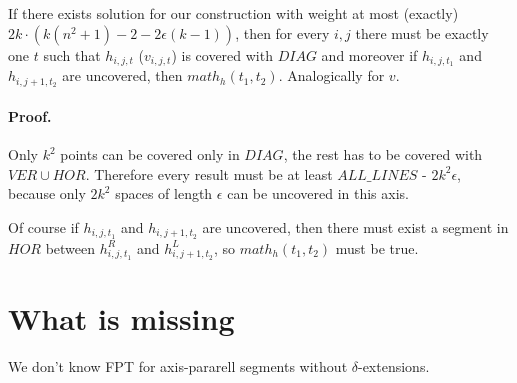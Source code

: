 \begin{lemma}
	\label{main_soundness_construction}
	If there exists solution for our construction
	with weight at most (exactly)
	$2k \cdot (k(n^2+1) - 2 - 2\epsilon(k-1))$,
	then for every $i, j$
	there must be exactly one $t$ such that $h_{i, j, t}$
	($v_{i, j, t}$) 
	is covered with $DIAG$
	and moreover if $h_{i, j, t_1}$ and $h_{i, j+1, t_2}$
	are uncovered, then $math_h(t_1, t_2)$.
	Analogically for $v$.
\end{lemma}
\paragraph{Proof.}
Only $k^2$ points can be covered only in $DIAG$, the rest
has to be covered with $VER \cup HOR$.
Therefore every result must be at least $ALL\_LINES$ - $2k^2\epsilon$,
because only $2k^2$ spaces of length $\epsilon$
can be uncovered in this axis.

Of course if $h_{i, j, t_1}$ and $h_{i, j+1, t_2}$
are uncovered, then there must exist
a segment in $HOR$ between $h^R_{i, j, t_1}$ and $h^L_{i, j+1, t_2}$,
so $math_h(t_1, t_2)$ must be true.



\section{What is missing}
We don't know FPT for axis-pararell segments without $\delta$-extensions.

